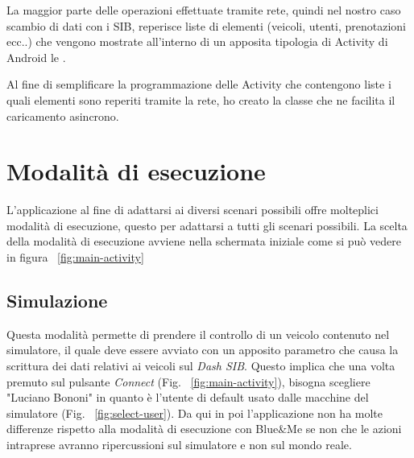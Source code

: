 La maggior parte delle operazioni effettuate tramite rete, quindi nel nostro caso scambio di dati con i SIB, reperisce liste di elementi (veicoli, utenti, prenotazioni ecc..) che vengono mostrate all'interno di un apposita tipologia di Activity di Android le .

Al fine di semplificare la programmazione delle Activity che contengono liste i quali elementi sono reperiti tramite la rete, ho creato la classe  che ne facilita il caricamento asincrono.


\section{Modalità di esecuzione}

L'applicazione al fine di adattarsi ai diversi scenari possibili offre molteplici modalità di esecuzione, questo per adattarsi a tutti gli scenari possibili. La scelta della modalità di esecuzione avviene nella schermata iniziale come si può vedere in figura ~\ref{fig:main-activity}

\subsection{Simulazione}

Questa modalità permette di prendere il controllo di un veicolo contenuto nel simulatore, il quale deve essere avviato con un apposito parametro che causa la scrittura dei dati relativi ai veicoli sul \emph{Dash SIB}. Questo implica che una volta premuto sul pulsante \emph{Connect} (Fig. ~\ref{fig:main-activity}), bisogna scegliere "Luciano Bononi" in quanto è l'utente di default usato dalle macchine del simulatore (Fig. ~\ref{fig:select-user}). Da qui in poi l'applicazione non ha molte differenze rispetto alla modalità di esecuzione con Blue\&{}Me se non che le azioni intraprese avranno ripercussioni sul simulatore e non sul mondo reale.

